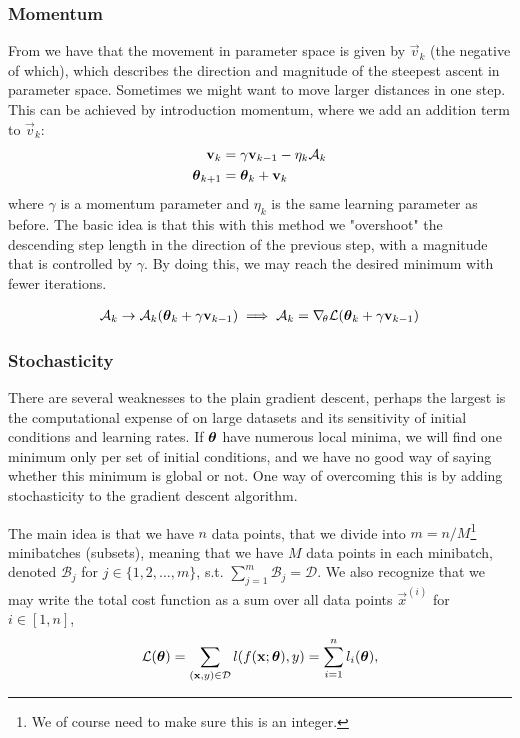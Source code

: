     \subsubsection{Momentum}\label{sec:momentum}
        From  we have that the movement in parameter space is given by $\vec{v}_k$ (the negative of which), which describes the direction and magnitude of the steepest ascent in parameter space. Sometimes we might want to move larger distances in one step. This can be achieved by introduction momentum, where we add an addition term to $\vec{v}_k$:
        \begin{align}
            \mathbf{v}_k &= \gamma\mathbf{v}_{k-1} - \eta_k\mathcal{A}_k \nonumber \\
            \boldsymbol{\theta}_{k+1} &= \boldsymbol{\theta}_k + \mathbf{v}_k
        \end{align}
        where $\gamma$ is a momentum parameter and $\eta_k$ is the same learning parameter as before. The basic idea is that this with this method we "overshoot" the descending step length in the direction of the previous step, with a magnitude that is controlled by $\gamma$. By doing this, we may reach the desired minimum with fewer iterations. 

        \begin{align}\label{eq:nag}
            \mathcal{A}_k \to \mathcal{A}_k(\boldsymbol{\theta}_k + \gamma\mathbf{v}_{k-1}) \implies \mathcal{A}_k= \nabla_{\!\theta}\mathcal{L}(\boldsymbol{\theta}_k + \gamma\mathbf{v}_{k-1})
        \end{align}

    \subsubsection{Stochasticity}\label{sec:stochasticity}
        There are several weaknesses to the plain gradient descent, perhaps the largest is the computational expense of on large datasets and its sensitivity of initial conditions and learning rates. If $\boldsymbol{\theta}$ have numerous local minima, we will find one minimum only per set of initial conditions, and we have no good way of saying whether this minimum is global or not. One way of overcoming this is by adding stochasticity to the gradient descent algorithm. 

        The main idea is that we have $n$ data points, that we divide into $m=n/M$\footnote{We of course need to make sure this is an integer. } minibatches (subsets), meaning that we have $M$ data points in each minibatch, denoted $\mathcal{B}_j$ for $j\in\{1,2,\dots,m\}$, s.t. $\sum\nolimits_{j=1}^m \mathcal{B}_j = \mathcal{D}$. We also recognize that we may write the total cost function as a sum over all data points $\vec{x}^{(i)}$ for $i\in[1,n]$, 
        \begin{equation}
            \mathcal{L}(\boldsymbol{\theta}) =\sum_{(\mathbf{x}, y)\in \mathcal{D}} l(f(\mathbf{x};\boldsymbol{\theta}), y) = \sum_{i=1}^n l_i(\boldsymbol{\theta}),
        \end{equation}

